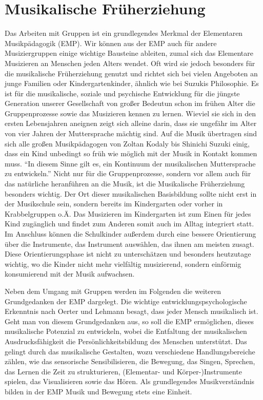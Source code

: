 \section{Musikalische Früherziehung}

Das Arbeiten mit Gruppen ist ein grundlegendes Merkmal der Elementaren
Musikpädagogik (EMP). Wir können aus der EMP auch für andere Musiziergruppen
einige wichtige Bausteine ableiten, zumal sich das Elementare Musizieren an
Menschen jeden Alters wendet.
\autocite[226]{busch:grundwissen_instrumentalpaedagogik} Oft wird sie jedoch
besonders für die musikalische Früherziehung genutzt und richtet sich bei vielen
Angeboten an junge Familien oder Kindergartenkinder, ähnlich wie bei Suzukis
Philosophie. Es ist  für die musikalische, soziale und psychische Entwicklung
für die jüngste Generation unserer Gesellschaft von großer Bedeutun schon im
frühen Alter die Gruppenprozesse sowie das Musizieren kennen zu lernen. Wieviel sie sich in den
ersten Lebensjahren aneignen zeigt sich alleine darin, dass sie ungefähr im
Alter von vier Jahren der Muttersprache mächtig sind. Auf die Musik übertragen
sind sich alle großen Musikpädagogen von Zoltan Kodaly bis Shinichi Suzuki
einig, dass ein Kind unbedingt so früh wie möglich mit der Musik in Kontakt
kommen muss. \enquote{In diesem Sinne gilt es, ein Kontinuum der musikalischen
Muttersprache zu entwickeln.}
\autocite[45]{ernst:die_zukunftsfaehige_musikschule} Nicht nur für die
Gruppenprozesse, sondern vor allem auch für das natürliche heranführen an die
Musik, ist die Musikalische Früherziehung besonders wichtig. Der Ort dieser
musikalischen Basisbildung sollte nicht erst in der Musikschule sein, sondern
bereits im Kindergarten oder vorher in Krabbelgruppen o.Ä.
\autocite[43]{ernst:die_zukunftsfaehige_musikschule}
Das Musizieren im Kindergarten ist zum Einen für jedes Kind zugänglich und
findet zum Anderen somit auch im Alltag integriert statt. Im Anschluss können
die Schulkinder außerdem durch eine bessere Orientierung über die Instrumente,
das Instrument auswählen, das ihnen am meisten zusagt. Diese Orientierungsphase
ist nicht zu unterschätzen und besonders heutzutage wichtig, wo die Kinder nicht
mehr vielfältig musizierend, sondern einförmig konsumierend mit der Musik
aufwachsen.\autocite[37]{ernst:die_zukunftsfaehige_musikschule}

Neben dem Umgang mit Gruppen werden im Folgenden die weiteren Grundgedanken der
EMP dargelegt. Die wichtige entwicklungspsychologische Erkenntnis nach Oerter
und Lehmann besagt, dass jeder Mensch musikalisch
ist.\autocite[88]{musikalische_begabung} Geht man von diesem Grundgedanken aus,
so soll die EMP ermöglichen, dieses musikalische Potenzial zu entwickeln, wobei
die Entfaltung der musikalischen Ausdrucksfähigkeit die Persönlichkeitsbildung
des Menschen unterstützt. Das gelingt durch das musikalische Gestalten, wozu
verschiedene Handlungsbereiche zählen, wie das sensorische Sensibilisieren, die
Bewegung, das Singen, Sprechen, das Lernen die Zeit zu strukturieren,
(Elementar-  und Körper-)Instrumente spielen, das Visualisieren sowie das Hören.
\autocite[227]{busch:grundwissen_instrumentalpaedagogik} Als grundlegendes
Musikverständnis bilden in der EMP Musik und Bewegung stets eine Einheit.


